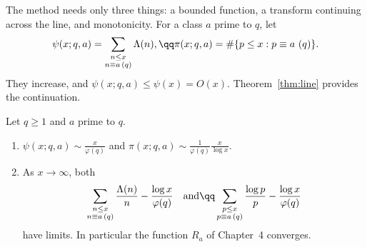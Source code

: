 The method needs only three things: a bounded function, a transform continuing across the line, and monotonicity. For a class $a$ prime to $q$, let
\[
\begin{gathered}\psi(x;q,a)=\sum_{\substack{n\le x\\n\equiv a\,(q)}}\Lambda(n),\qq\pi(x;q,a)=\#\{p\le x:p\equiv a\ (q)\}.\end{gathered}
\]
They increase, and $\psi(x;q,a)\le\psi(x)=O(x)$. Theorem~\ref{thm:line} provides the continuation.

\begin{theorem}\label{thm:pntap}
Let $q\ge1$ and $a$ prime to $q$.
\begin{enumerate}[label=(\alph*)]
\item $\psi(x;q,a)\sim\frac x{\varphi(q)}$ and $\pi(x;q,a)\sim\frac1{\varphi(q)}\frac x{\log x}$.
\item As $x\to\infty$, both
\[
\begin{gathered}\sum_{\substack{n\le x\\n\equiv a\,(q)}}\frac{\Lambda(n)}n-\frac{\log x}{\varphi(q)}\quad\text{and}\qq\sum_{\substack{p\le x\\p\equiv a\,(q)}}\frac{\log p}p-\frac{\log x}{\varphi(q)}\end{gathered}
\]
have limits. In particular the function $R_a$ of Chapter~4 converges.
\end{enumerate}
\end{theorem}
